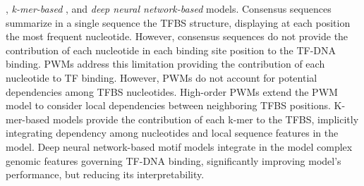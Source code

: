 \documentclass[a4paper, titlepage, 8pt, openright]{book}
\begin{document}
\citep{siddharthan2010dinucleotide,korhonen2017fast}, \emph{k-mer-based}  \citep{gorkin2012integration}, and \emph{deep neural network-based} \citep{he2021survey} models. Consensus sequences summarize in a single sequence the TFBS structure, displaying at each position the most frequent nucleotide. However, consensus sequences do not provide the contribution of each nucleotide in each binding site position to the TF-DNA binding. PWMs address this limitation providing the contribution of each nucleotide to TF binding. However, PWMs do not account for potential dependencies among TFBS nucleotides. High-order PWMs extend the PWM model to consider local dependencies between neighboring TFBS positions. K-mer-based models provide the contribution of each k-mer to the TFBS, implicitly integrating dependency among nucleotides and local sequence features in the model. Deep neural network-based motif models integrate in the model complex genomic features governing TF-DNA binding, significantly improving model's performance, but reducing its interpretability.
\end{document}
